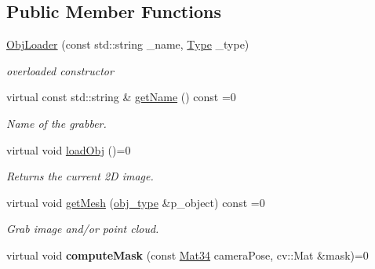 \subsection*{Public Member Functions}
\begin{DoxyCompactItemize}
\item 
\hyperlink{classputar_1_1ObjLoader_a6c20e772acf329b12f33759405070e36}{Obj\+Loader} (const std\+::string \+\_\+name, \hyperlink{classputar_1_1ObjLoader_a4891ad8bb46a1414e2e9f202c1552e09}{Type} \+\_\+type)\hypertarget{classputar_1_1ObjLoader_a6c20e772acf329b12f33759405070e36}{}\label{classputar_1_1ObjLoader_a6c20e772acf329b12f33759405070e36}

\begin{DoxyCompactList}\small\item\em overloaded constructor \end{DoxyCompactList}\item 
virtual const std\+::string \& \hyperlink{classputar_1_1ObjLoader_ae6dad14a43f50aa53290e98e0304a1b1}{get\+Name} () const =0\hypertarget{classputar_1_1ObjLoader_ae6dad14a43f50aa53290e98e0304a1b1}{}\label{classputar_1_1ObjLoader_ae6dad14a43f50aa53290e98e0304a1b1}

\begin{DoxyCompactList}\small\item\em Name of the grabber. \end{DoxyCompactList}\item 
virtual void \hyperlink{classputar_1_1ObjLoader_a28b81f23390667b1d7b6e56f8a7acc6d}{load\+Obj} ()=0\hypertarget{classputar_1_1ObjLoader_a28b81f23390667b1d7b6e56f8a7acc6d}{}\label{classputar_1_1ObjLoader_a28b81f23390667b1d7b6e56f8a7acc6d}

\begin{DoxyCompactList}\small\item\em Returns the current 2D image. \end{DoxyCompactList}\item 
virtual void \hyperlink{classputar_1_1ObjLoader_a3ea84cc9d21a2f35f6befc2cde1c3c80}{get\+Mesh} (\hyperlink{structputar_1_1obj__type}{obj\+\_\+type} \&p\+\_\+object) const =0\hypertarget{classputar_1_1ObjLoader_a3ea84cc9d21a2f35f6befc2cde1c3c80}{}\label{classputar_1_1ObjLoader_a3ea84cc9d21a2f35f6befc2cde1c3c80}

\begin{DoxyCompactList}\small\item\em Grab image and/or point cloud. \end{DoxyCompactList}\item 
virtual void {\bfseries compute\+Mask} (const \hyperlink{namespaceputar_a8bf3c8025ae8f60f553a752014c9849a}{Mat34} camera\+Pose, cv\+::\+Mat \&mask)=0\hypertarget{classputar_1_1ObjLoader_a098f9c13ea786f898110527517134a3b}{}\label{classputar_1_1ObjLoader_a098f9c13ea786f898110527517134a3b}


\end{DoxyCompactItemize}
